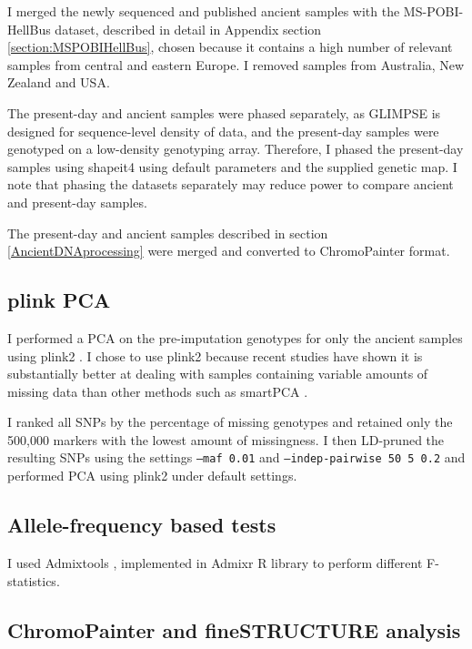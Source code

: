 I  merged the newly sequenced and published ancient samples with the MS-POBI-HellBus dataset, described in detail in Appendix section \ref{section:MSPOBIHellBus}, chosen because it contains a high number of relevant samples from central and eastern Europe. I removed samples from Australia, New Zealand and USA.

The present-day and ancient samples were phased separately, as GLIMPSE is designed for sequence-level density of data, and the present-day samples were genotyped on a low-density genotyping array. Therefore, I phased the present-day samples using shapeit4 \cite{delaneau2018integrative} using default parameters and the supplied genetic map. I note that phasing the datasets separately may reduce power to compare ancient and present-day samples. 

The present-day and ancient samples described in section \ref{AncientDNAprocessing} were merged and converted to ChromoPainter format.

\subsection{plink PCA}

I performed a PCA on the pre-imputation genotypes for only the ancient samples using plink2 \cite{chang2015second}. I chose to use plink2 because recent studies have shown it is substantially better at dealing with samples containing variable amounts of missing data than other methods such as smartPCA \cite{AlbrechtsenPCAmissingness}.

I ranked all SNPs by the percentage of missing genotypes and retained only the 500,000 markers with the lowest amount of missingness. I then LD-pruned the resulting SNPs using the settings \texttt{--maf 0.01} and \texttt{--indep-pairwise 50 5 0.2} and performed PCA using plink2 under default settings. 

\subsection{Allele-frequency based tests}

I used Admixtools \cite{Patterson2012}, implemented in Admixr R library \cite{admixrpetr2019} to perform  different F-statistics.

\subsection{ChromoPainter and fineSTRUCTURE analysis}

